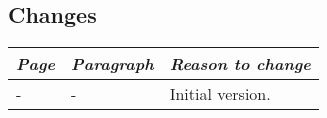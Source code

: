 \subsection*{Changes}
\begin{tabularx}{\textwidth}{llX}
    \toprule
    \emph{Page} & \emph{Paragraph} & \emph{Reason to change} \\
    \midrule
    - & -  & Initial version. \\
    \bottomrule
\end{tabularx}

